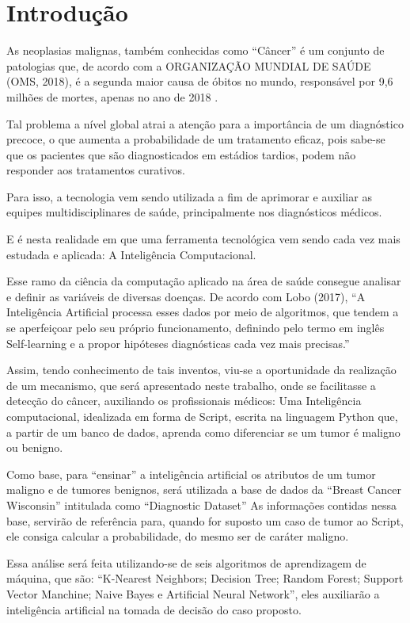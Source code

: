 \chapter{Introdução}
\label{chapter:introducao}

As neoplasias malignas, também conhecidas como “Câncer” é um conjunto de patologias que, 
de acordo com a ORGANIZAÇÃO MUNDIAL DE SAÚDE (OMS, 2018), 
é a segunda maior causa de óbitos no mundo, 
responsável por 9,6 milhões de mortes, apenas no ano de 2018 \cite{ESTATISTICACANCER}
.

Tal problema a nível global atrai a atenção para a importância de um diagnóstico precoce, 
o que aumenta a probabilidade de um tratamento eficaz, pois sabe-se que os pacientes que são diagnosticados em estádios tardios, 
podem não responder aos tratamentos curativos.

Para isso, a tecnologia vem sendo utilizada a fim de aprimorar e auxiliar as equipes multidisciplinares de saúde, 
principalmente nos diagnósticos médicos.

E é nesta realidade em que uma ferramenta tecnológica vem sendo cada vez mais estudada e aplicada: 
A Inteligência Computacional.

Esse ramo da ciência da computação aplicado na área de saúde consegue analisar e definir as variáveis de diversas doenças. 
De acordo com Lobo (2017), “A Inteligência Artificial processa esses dados por meio de algoritmos, 
que tendem a se aperfeiçoar pelo seu próprio funcionamento, 
definindo pelo termo em inglês Self-learning e a propor hipóteses diagnósticas cada vez mais precisas.”
\cite{IAEMSAUDE}

Assim, tendo conhecimento de tais inventos, viu-se a oportunidade da realização de um mecanismo, 
que será apresentado neste trabalho, onde se facilitasse a detecção do câncer, auxiliando os profissionais médicos: 
Uma Inteligência computacional, idealizada em forma de Script, escrita na linguagem Python que, 
a partir de um banco de dados, aprenda como diferenciar se um tumor é maligno ou benigno.

Como base, para “ensinar” a inteligência artificial os atributos de um tumor maligno e de tumores benignos, 
será utilizada a base de dados da “Breast Cancer Wisconsin” intitulada como “Diagnostic Dataset” As informações contidas nessa base, 
servirão de referência para, quando for suposto um caso de tumor ao Script, ele consiga calcular a probabilidade, 
do mesmo ser de caráter maligno.

Essa análise será feita utilizando-se de seis algoritmos de aprendizagem de máquina, que são: “K-Nearest Neighbors; 
Decision Tree; Random Forest; Support Vector Manchine; Naive Bayes e Artificial Neural Network”, eles auxiliarão a inteligência artificial na tomada de decisão do caso proposto.


















